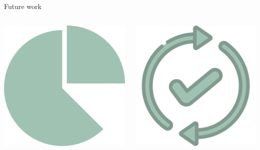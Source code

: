 \documentclass[9pt, pstricks, xcolor=dvipsnames]{beamer}
\begin{document}
\begin{frame}{Future work}

\begin{columns}
  \begin{column}{0.5\textwidth}
    \centering
    \includegraphics[scale=0.2]{images/portion.png}
    \pause
  \end{column}
  \begin{column}{0.5\textwidth}
    \centering
    \includegraphics[scale=0.2]{images/update.png}
  \end{column}
\end{columns}
\end{frame}
\AtEndDocument\maketitle
\end{document}
